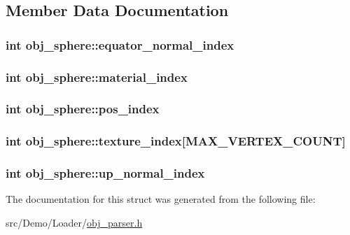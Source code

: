 \subsection{Member Data Documentation}
\hypertarget{structobj__sphere_aeefc59c5cf2a8182c9065c8be98a1822}{
\subsubsection[{equator\+\_\+normal\+\_\+index}]{\setlength{\rightskip}{0pt plus 5cm}int obj\+\_\+sphere\+::equator\+\_\+normal\+\_\+index}}\label{structobj__sphere_aeefc59c5cf2a8182c9065c8be98a1822}
\hypertarget{structobj__sphere_a426a609cef880851545e56ffd220ed35}{
\subsubsection[{material\+\_\+index}]{\setlength{\rightskip}{0pt plus 5cm}int obj\+\_\+sphere\+::material\+\_\+index}}\label{structobj__sphere_a426a609cef880851545e56ffd220ed35}
\hypertarget{structobj__sphere_a15fd097586d7b88ac867b4f0ef5bfa8b}{
\subsubsection[{pos\+\_\+index}]{\setlength{\rightskip}{0pt plus 5cm}int obj\+\_\+sphere\+::pos\+\_\+index}}\label{structobj__sphere_a15fd097586d7b88ac867b4f0ef5bfa8b}
\hypertarget{structobj__sphere_a14cbe08a18e529415cc1166e4f27ff8d}{
\subsubsection[{texture\+\_\+index}]{\setlength{\rightskip}{0pt plus 5cm}int obj\+\_\+sphere\+::texture\+\_\+index\mbox{[}{\bf M\+A\+X\+\_\+\+V\+E\+R\+T\+E\+X\+\_\+\+C\+O\+U\+N\+T}\mbox{]}}}\label{structobj__sphere_a14cbe08a18e529415cc1166e4f27ff8d}
\hypertarget{structobj__sphere_a1bd3b2af2191462e31f8a2a7d7a9105e}{
\subsubsection[{up\+\_\+normal\+\_\+index}]{\setlength{\rightskip}{0pt plus 5cm}int obj\+\_\+sphere\+::up\+\_\+normal\+\_\+index}}\label{structobj__sphere_a1bd3b2af2191462e31f8a2a7d7a9105e}


The documentation for this struct was generated from the following file\+:\begin{DoxyCompactItemize}
\item 
src/\+Demo/\+Loader/\hyperlink{obj__parser_8h}{obj\+\_\+parser.\+h}\end{DoxyCompactItemize}
